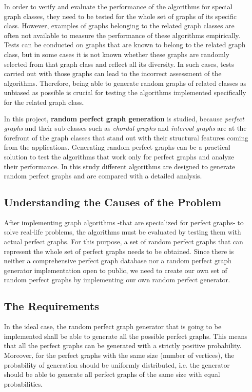 In order to verify and evaluate the performance of the algorithms for special graph classes, they need to be tested for the whole set of graphs of its specific class. However, examples of graphs belonging to the related graph classes are often not available to measure the performance of these algorithms empirically. Tests can be conducted on graphs that are known to belong to the related graph class, but in some cases it is not known whether these graphs are randomly selected from that graph class and reflect all its diversity. In such cases, tests carried out with those graphs can lead to the incorrect assessment of the algorithms. Therefore, being able to generate random graphs of related classes as unbiased as possible is crucial for testing the algorithms implemented specifically for the related graph class.

In this project, \textbf{random perfect graph generation} is studied, because \textit{perfect graphs} and their sub-classes such as \textit{chordal graphs} and \textit{interval graphs} are at the forefront of the graph classes that stand out with their structural features coming from the applications. Generating random perfect graphs can be a practical solution to test the algorithms that work only for perfect graphs and analyze their performance. In this study different algorithms are designed to generate random perfect graphs and are compared with a detailed analysis.

\subsection{Understanding the Causes of the Problem}

After implementing graph algorithms -that are specialized for perfect graphs- to solve real-life problems, the algorithms must be evaluated by testing them with actual perfect graphs. For this purpose, a set of random perfect graphs that can represent the whole set of perfect graphs needs to be obtained. Since there is neither a comprehensive perfect graph database nor a random perfect graph generator implementation open to public, we need to create our own set of random perfect graphs by implementing our own random perfect generator.

\subsection{The Requirements}

In the ideal case, the random perfect graph generator that is going to be implemented shall be able to generate all the possible perfect graphs. This means that all the perfect graphs can be generated with a strictly positive probability. Moreover, for the perfect graphs with the same size (number of vertices), the probability of generation should be uniformly distributed, i.e. the generator should be able to generate all perfect graphs of the same size with equal probabilities.

